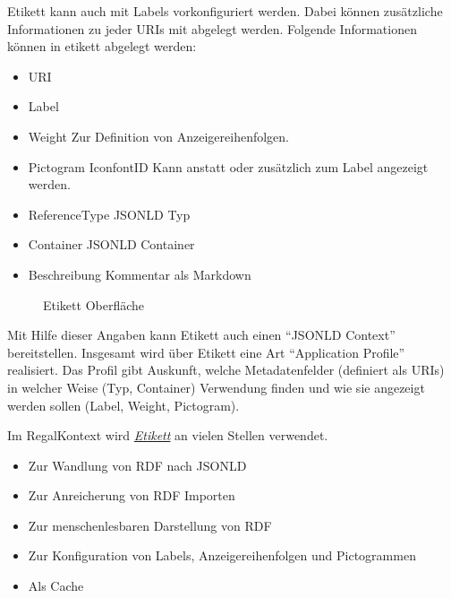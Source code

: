 \documentclass[letterpaper,10pt,english]{sphinxmanual}
\begin{document}
\sphinxAtStartPar
Etikett kann auch mit Labels vorkonfiguriert werden. Dabei können
zusätzliche Informationen zu jeder URIs mit abgelegt werden. Folgende
Informationen können in etikett abgelegt werden:
\begin{itemize}
\item {} 
\sphinxAtStartPar
URI

\item {} 
\sphinxAtStartPar
Label

\item {} 
\sphinxAtStartPar
Weight \sphinxhyphen{} Zur Definition von Anzeigereihenfolgen.

\item {} 
\sphinxAtStartPar
Pictogram Iconfont\sphinxhyphen{}ID \sphinxhyphen{} Kann anstatt oder zusätzlich zum Label
angezeigt werden.

\item {} 
\sphinxAtStartPar
ReferenceType \sphinxhyphen{} JSON\sphinxhyphen{}LD Typ

\item {} 
\sphinxAtStartPar
Container \sphinxhyphen{} JSON\sphinxhyphen{}LD Container

\item {} 
\sphinxAtStartPar
Beschreibung \sphinxhyphen{} Kommentar als Markdown

\end{itemize}

\begin{figure}[htbp]
\centering
\capstart

\noindent{}
\caption{Etikett Oberfläche}\label{\detokenize{toscience:id99}}\end{figure}

\sphinxAtStartPar
Mit Hilfe dieser Angaben kann Etikett auch einen “JSON\sphinxhyphen{}LD Context”
bereitstellen. Insgesamt wird über Etikett eine Art “Application
Profile” realisiert. Das Profil gibt Auskunft, welche Metadatenfelder
(definiert als URIs) in welcher Weise (Typ, Container) Verwendung finden
und wie sie angezeigt werden sollen (Label, Weight, Pictogram).

\sphinxAtStartPar
Im Regal\sphinxhyphen{}Kontext wird {\hyperref[\detokenize{toscience:_etikett}]{\emph{Etikett}}} an vielen Stellen
verwendet.
\begin{itemize}
\item {} 
\sphinxAtStartPar
Zur Wandlung von RDF nach JSON\sphinxhyphen{}LD

\item {} 
\sphinxAtStartPar
Zur Anreicherung von RDF Importen

\item {} 
\sphinxAtStartPar
Zur menschenlesbaren Darstellung von RDF

\item {} 
\sphinxAtStartPar
Zur Konfiguration von Labels, Anzeigereihenfolgen und Pictogrammen

\item {} 
\sphinxAtStartPar
Als Cache

\end{itemize}
\end{document}
